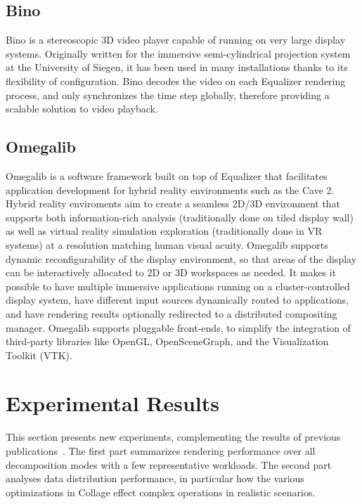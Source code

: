 \documentclass[10pt,journal,compsoc]{IEEEtran}
\begin{document}
\subsection{Bino}

Bino is a stereoscopic 3D video player capable of running on very large display
systems. Originally written for the immersive semi-cylindrical projection
system at the University of Siegen, it has been used in many installations
thanks to its flexibility of configuration. Bino decodes the video on each
Equalizer rendering process, and only synchronizes the time step globally,
therefore providing a scalable solution to video playback.

\subsection{Omegalib}

Omegalib \cite{Omegalib} is a software framework built on top of Equalizer that
facilitates application development for hybrid reality environments such as the
Cave 2. Hybrid reality enviroments aim to create a seamless 2D/3D environment
that supports both information-rich analysis (traditionally done on tiled
display wall) as well as virtual reality simulation exploration (traditionally
done in VR systems) at a resolution matching human visual acuity. Omegalib
supports dynamic reconfigurability of the display environment, so that areas of
the display can be interactively allocated to 2D or 3D workspaces as needed. It
makes it possible to have multiple immersive applications running on a
cluster-controlled display system, have different input sources dynamically
routed to applications, and have rendering results optionally redirected to a
distributed compositing manager. Omegalib supports pluggable front-ends, to
simplify the integration of third-party libraries like OpenGL, OpenSceneGraph,
and the Visualization Toolkit (VTK).

\section{Experimental Results}\label{sec:results}

This section presents new experiments, complementing the results of previous
publications~\cite{EP:07, EMP:09, MEP:10, EEP:11, EBAHMP:12, HBBES:13, deflect,
  SPEP:16}. The first part summarizes rendering performance over all
decomposition modes with a few representative workloads. The second part
analyses data distribution performance, in particular how the various
optimizations in \textsf{Collage} effect complex operations in realistic
scenarios.
\end{document}
